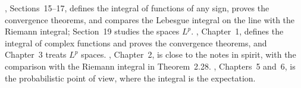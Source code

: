 
\furtherreading
\textcite{billingsley}, Sections~15--17, defines the integral of functions of any sign, proves
the convergence theorems, and compares the Lebesgue integral on the line with the Riemann
integral; Section~19 studies the spaces $L^p$. \textcite{rudin-rca}, Chapter~1, defines the integral of
complex functions and proves the convergence theorems, and Chapter~3 treats $L^p$ spaces. \textcite{folland}, Chapter~2, is
close to the notes in spirit, with the comparison with the Riemann integral in Theorem~2.28.
\textcite{williams}, Chapters~5 and~6, is the probabilistic point of view, where the integral
is the expectation.
